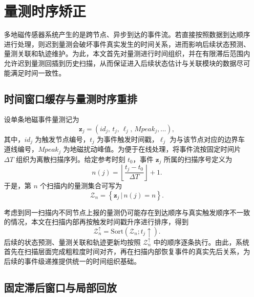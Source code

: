 \documentclass{xdupgthesis}
\begin{document}
\section{量测时序矫正}

多地磁传感器系统产生的是跨节点、异步到达的事件流。若直接按照数据到达顺序进行处理，则迟到量测会破坏事件真实发生的时间关系，进而影响后续状态预测、量测关联和轨迹维护。为此，本文首先对量测进行时间组织，并在有限滞后范围内允许迟到量测回插到历史扫描，从而保证进入后续状态估计与关联模块的数据尽可能满足时间一致性。

\subsection{时间窗口缓存与量测时序重排}

设单条地磁事件量测记为
\begin{equation}
	\mathbf z_j=\left(id_j,\,t_j,\,\ell_j,\,Mpeak_j,\ldots\right),
	\label{eq:ch3_event_def}
\end{equation}
其中，$id_j$ 为触发节点编号，$t_j$ 为事件触发时间戳，$\ell_j$ 为与该节点对应的边界车道线编号，$Mpeak_j$ 为地磁扰动峰值。为便于在线处理，将事件流按固定时间片 $\Delta T$ 组织为离散扫描序列。给定参考时刻 $t_0$，事件 $\mathbf z_j$ 所属的扫描序号定义为
\begin{equation}
	n(j)=\left\lfloor \frac{t_j-t_0}{\Delta T} \right\rfloor +1.
	\label{eq:ch3_scan_index}
\end{equation}
于是，第 $n$ 个扫描内的量测集合可写为
\begin{equation}
	\mathcal Z_n=
	\left\{
	\mathbf z_j\,\big|\, n(j)=n
	\right\}.
	\label{eq:ch3_scan_set}
\end{equation}

考虑到同一扫描内不同节点上报的量测仍可能存在到达顺序与真实触发顺序不一致的情况，本文在扫描内部再按触发时间戳升序进行排序，得到
\begin{equation}
	\mathcal Z_n^{\uparrow}=\mathrm{Sort}\left(\mathcal Z_n; t_j\uparrow\right).
	\label{eq:ch3_scan_sort}
\end{equation}
后续的状态预测、量测关联和轨迹更新均按照 $\mathcal Z_n^{\uparrow}$ 中的顺序逐条执行。由此，系统首先在扫描层面完成粗粒度时间对齐，再在扫描内部恢复事件的真实先后关系，为后续的事件级递推提供统一的时间组织基础。

\subsection{固定滞后窗口与局部回放}
\end{document}
